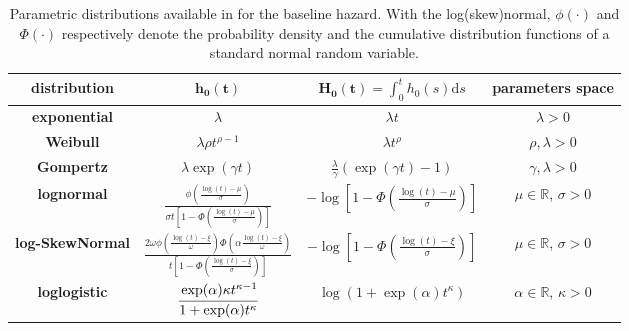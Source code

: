 \begin{table}[] \centering 
\renewcommand{\arraystretch}{1.5}
  \begin{tabular}{cccc}
  \hline \hline
  {\bf distribution}
    & $\bm{h_{0}(t)}$
    & $\bm{H_{0}(t)} = \int_{0}^{t} h_{0} ( s ) \textrm{d} s$
    & {\bf parameters space}
  \\ %
  \hline
  {\bf exponential}
    & $\lambda$
    & $\lambda t$
    & $\lambda > 0$
  \\ %
  {\bf Weibull}
    & $\lambda \rho t^{\rho - 1}$
    & $\lambda t^{\rho}$
    & $\rho, \lambda > 0$
  \\ %
  {\bf Gompertz}
    & $\lambda \exp ( \gamma t )$
    & $\frac{\lambda}{\gamma} \left(\exp (\gamma t) - 1\right)$
    & $\gamma, \lambda > 0$
  \\ %
  \multirow{2}{*}{{\bf lognormal}}
    & \multirow{2}{*}{$\frac{\phi \left(\tfrac{\log(t) - \mu}{\sigma} \right)}
	      		   {\sigma t \left[1 - \Phi\left(\tfrac{\log(t) - \mu}{\sigma} \right) \right]}$}
    & \multirow{2}{*}{$- \log \left[1 - \Phi\left(\tfrac{\log(t) - \mu}{\sigma} \right)\right]$}
    & \multirow{2}{*}{$\mu \in \mathbb{R}$, $\sigma > 0$}
    \\&&&
  \\ %
  \multirow{2}{*}{{\bf log-SkewNormal}}
    & \multirow{2}{*}{$\frac{
        2 \omega 
        \phi\left(\frac{\log(t) - \xi}{\omega}\right)
        \Phi\left(\alpha\frac{\log(t)-\xi}{\omega}\right)
        }{
         t \left[1 - \Phi\left(\tfrac{\log(t) - \xi}{\sigma} \right) \right]}$}
    & \multirow{2}{*}{$- \log \left[1 - \Phi\left(\tfrac{\log(t) - \xi}{\sigma} \right)\right]$}
    & \multirow{2}{*}{$\mu \in \mathbb{R}$, $\sigma > 0$}
    \\&&&
  \\ %
  \multirow{2}{*}{{\bf loglogistic}}
    & \multirow{2}{*}{$\cfrac{\exp(\alpha) \kappa t^{\kappa - 1}}{1 + \exp(\alpha) t^{\kappa}}$}
    & \multirow{2}{*}{$\log \left(1 + \exp(\alpha) t^{\kappa}\right)$} & \multirow{2}{*}{$\alpha \in \mathbb{R}$, $\kappa > 0$}
    \\&&&
    \\                
	\hline \hline
	\end{tabular}
\caption{Parametric distributions available in  for the baseline hazard.
    With the log(skew)normal, $\phi(\cdot)$ and $\Phi(\cdot)$ respectively denote the probability density and the cumulative distribution functions of a standard normal random variable.}
\label{tab:model.baselines}	
\end{table} 

% 